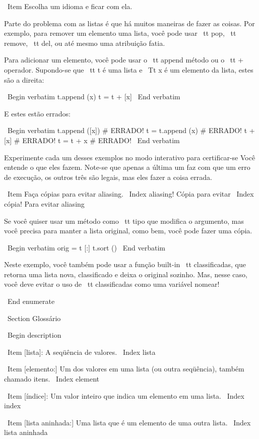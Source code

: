 \documentclass[10pt]{book}
\begin{document}
\begin {itemize}
{{{{{{{\ Item Escolha um idioma e ficar com ela.

Parte do problema com as listas é que há muitos
maneiras de fazer as coisas. Por exemplo, para remover um elemento
uma lista, você pode usar {\ tt pop}, {\ tt remove}, {\ tt del},
ou até mesmo uma atribuição fatia.

Para adicionar um elemento, você pode usar o {\ tt} append método ou
o {\ tt +} operador. Supondo-se que {\ tt t} é uma lista e
{\ Tt x} é um elemento da lista, estes são a direita: 

\ Begin {verbatim}
t.append (x)
t = t + [x]
\ End {verbatim}

E estes estão errados:

\ Begin {verbatim}
t.append ([x]) # ERRADO!
t = t.append (x) # ERRADO!
t + [x] # ERRADO!
t = t + x # ERRADO!
\ End {verbatim}

Experimente cada um desses exemplos no modo interativo para certificar-se
Você entende o que eles fazem. Note-se que apenas a última
um faz com que um erro de execução, os outros três são legais, mas eles
fazer a coisa errada.


\ Item Faça cópias para evitar aliasing.
\ Index {aliasing! Cópia para evitar}
\ Index {cópia! Para evitar aliasing}

Se você quiser usar um método como {\ tt tipo} que modifica
o argumento, mas você precisa para manter a lista original, como
bem, você pode fazer uma cópia.

\ Begin {verbatim}
orig = t [:]
t.sort ()
\ End {verbatim}

Neste exemplo, você também pode usar a função built-in {\ tt classificadas},
que retorna uma lista nova, classificado e deixa o original sozinho.
Mas, nesse caso, você deve evitar o uso de {\ tt classificadas} como uma variável
nomear!

\ End {enumerate}



\ Section {} Glossário

\ Begin {description}

\ Item [lista]: A seqüência de valores.
\ Index {lista}

\ Item [elemento:] Um dos valores em uma lista (ou outra seqüência),
também chamado itens.
\ Index {element}

\ Item [índice]: Um valor inteiro que indica um elemento em uma lista.
\ Index {index}

\ Item [lista aninhada:] Uma lista que é um elemento de uma outra lista.
\ Index {lista aninhada}

}}}}}}}
\end{itemize}
\end{document}
